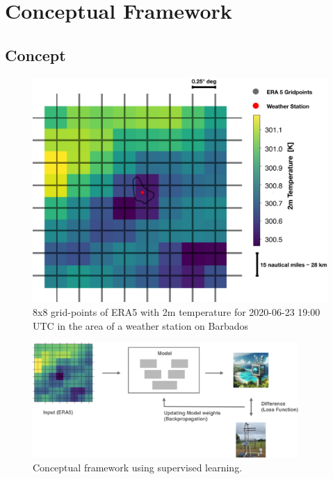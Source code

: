 \section{Conceptual Framework}
\label{sec: design}

\subsection{Concept}

\begin{figure}
    \centering
    \includegraphics[width=\textwidth]{resources/images/ERA5_tas_around_barbados.png}
    \caption{8x8 grid-points of ERA5 with 2m temperature 
    for 2020-06-23 19:00 UTC  in the area of a weather station on Barbados}    
    \label{fig:barbados}
\end{figure}

\begin{figure}
    \centering
    \includegraphics[width=0.9\textwidth]{resources/images/supervised_learning.png}
    \caption{Conceptual framework using supervised learning.}
    \label{fig:supervised_learning}
\end{figure}

